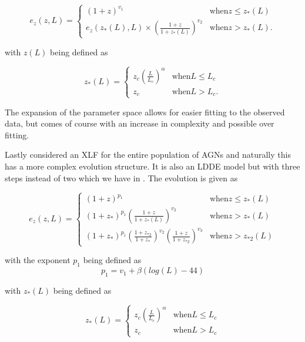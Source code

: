  \begin{equation}
    e_z(z, L) = 
    \begin{cases} 
        (1 + z)^{v_1} & \text{when} z \leq z_*(L) \\
        e_z(z_*(L), L) \times \left( \frac{1 + z}{1 + z_*(L)} \right)^{v_2} & \text{when} z >  z_*(L).
    \end{cases}
 \end{equation}

 with $z(L)$ being defined as

 \begin{equation}
    z_*(L) = 
    \begin{cases} 
        z_c \left( \frac{L}{L_c} \right)^\alpha & \text{when} L \leq L_c \\
        z_c & \text{when} L > L_c .
    \end{cases}
 \end{equation}


 The expansion of the parameter space allows for easier fitting to the observed data, but comes of course with an increase in complexity and possible over fitting. 

Lastly \cite{Ueda_2014} considered an XLF for the entire population of AGNs and naturally this has a more complex evolution structure. It is also an LDDE model but with three steps instead of two which we have in \cite{Silverman_2008}.
The evolution is given as

 
\begin{equation}
    e_z(z, L) = 
    \begin{cases} 
        (1 + z)^{p_1} & \text{when} z \leq z_*(L) \\
        (1 + z_{*})^{p_1} \left( \frac{1 + z}{1 + z_*(L)} \right)^{v_2} & \text{when} z >  z_*(L)\\
        (1 + z_{*})^{p_1} (\frac{1 + z_{*2}}{1+ z_{*}})^{v_2} (\frac{1+z}{1+z_{*2}})^{v_3} & \text{when} z >  z_{*2}(L)

    \end{cases}
\end{equation}

with the exponent $p_1$ being defined as
\begin{equation}
    p_1 = v_1 + \beta(log(L)-44)
\end{equation}

with $z_{*}(L)$ being defined as

\begin{equation}
    z_*(L) = 
    \begin{cases} 
        z_c \left( \frac{L}{L_c} \right)^\alpha & \text{when} L \leq L_c \\
        z_c & \text{when} L > L_c 
    \end{cases}
\end{equation}


